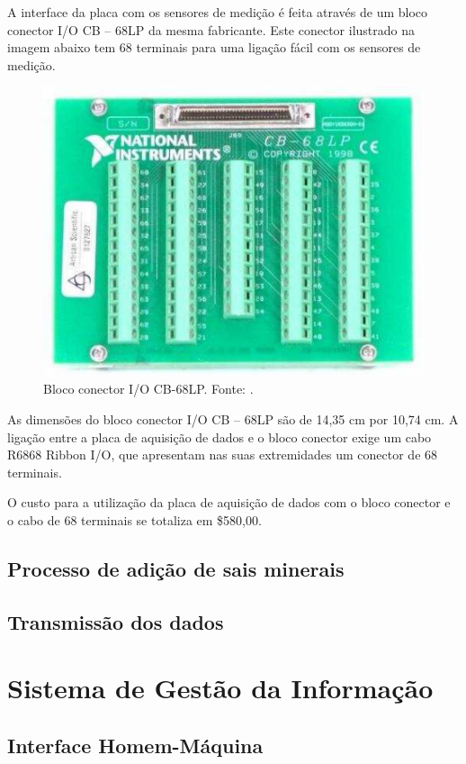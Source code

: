 	A interface da placa com os sensores de medição é feita através de um bloco conector I/O CB – 68LP da mesma fabricante. Este conector ilustrado na imagem abaixo tem 68 terminais para uma ligação fácil com os sensores de medição.
    
	\begin{figure}[!ht]
	  \centering
	  \includegraphics[scale=0.5]{editaveis/figuras/bloco_conector_placa_aquisicao}
	  \caption[Bloco conector I/O CB-68LP]
	      {Bloco conector I/O CB-68LP. Fonte: \cite{national04}.}
	\label{bloco_conector_placa_aquisicao}
	\end{figure}
	
	As dimensões do bloco conector I/O CB – 68LP são de 14,35 cm por 10,74 cm. A ligação entre a placa de aquisição de dados e o bloco conector exige um cabo R6868 Ribbon I/O, que apresentam nas suas extremidades um conector de 68 terminais. 
	
	O custo para a utilização da placa de aquisição de dados com o bloco conector e o cabo de 68 terminais se totaliza em \$580,00.
	
    \pagebreak
    \subsection{Processo de adição de sais minerais}
    
      
      
    \subsection{Transmissão dos dados}
    
      
    
  \vfill
  \pagebreak
  \section{Sistema de Gestão da Informação}
      
      
    \subsection{Interface Homem-Máquina}
      

    
    
    
    
    